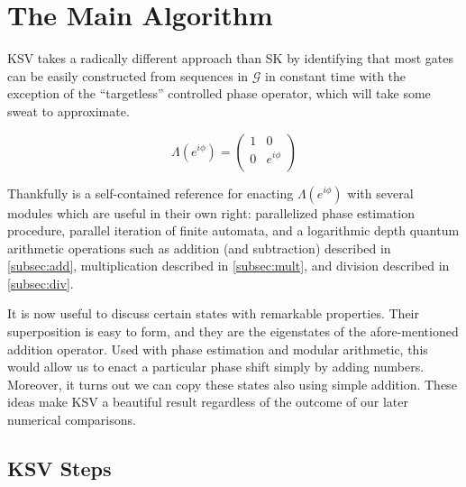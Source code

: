\section{The Main Algorithm}
\label{sec:main-algo}

KSV takes a radically different approach than SK by identifying that most gates
can be easily constructed from sequences in
$\mathcal{G}$ in constant time with the exception of the ``targetless''
controlled phase operator, which will take some sweat to approximate.

\begin{displaymath}
\Lambda(e^{i\phi}) = 
 \left(
  \begin{array}{cc}
    1 & 0 \\
    0 & e^{i\phi} \\
  \end{array} \right)
\end{displaymath}

Thankfully \cite{ksv02} is a self-contained reference
for enacting $\Lambda(e^{i\phi})$ with several modules which are useful in
their own right:
parallelized phase estimation procedure, parallel iteration of finite
automata, and a logarithmic depth quantum arithmetic operations such
as addition (and subtraction) described in \ref{subsec:add},
multiplication described in \ref{subsec:mult}, and division described
in \ref{subsec:div}.

It is now useful to discuss certain states with remarkable properties.
Their superposition is easy to form, and they are the eigenstates of the
afore-mentioned
addition operator. Used with phase estimation and modular arithmetic,
this would allow us to enact
a particular phase shift simply by adding numbers.
Moreover, it turns out we can copy these states
also using simple addition. These ideas make KSV a beautiful result
regardless of the outcome of our later numerical comparisons.





\subsection{KSV Steps}

